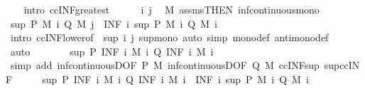 \begin{isabellebody}
\ \ \isamarkupfalse%
\ {\isacharparenleft}intro\ ccINF{\isacharunderscore}greatest{\isacharparenright}\isanewline
\ \ \ \ \isamarkupfalse%
\ i\ j\ \isamarkupfalse%
\ M\ assms{\isacharbrackleft}THEN\ inf{\isacharunderscore}continuous{\isacharunderscore}mono{\isacharbrackright}\ \isamarkupfalse%
\ {\isachardoublequoteopen}sup\ {\isacharparenleft}P\ {\isacharparenleft}M\ i{\isacharparenright}{\isacharparenright}\ {\isacharparenleft}Q\ {\isacharparenleft}M\ j{\isacharparenright}{\isacharparenright}\ {\isasymge}\ {\isacharparenleft}INF\ i{\isachardot}\ sup\ {\isacharparenleft}P\ {\isacharparenleft}M\ i{\isacharparenright}{\isacharparenright}\ {\isacharparenleft}Q\ {\isacharparenleft}M\ i{\isacharparenright}{\isacharparenright}{\isacharparenright}{\isachardoublequoteclose}\isanewline
\ \ \ \ \ \ \isamarkupfalse%
\ {\isacharparenleft}intro\ ccINF{\isacharunderscore}lower{}{\isacharbrackleft}of\ {\isacharunderscore}\ {\isachardoublequoteopen}sup\ i\ j{\isachardoublequoteclose}{\isacharbrackright}\ sup{\isacharunderscore}mono{\isacharparenright}\ {\isacharparenleft}auto\ simp{\isacharcolon}\ mono{\isacharunderscore}def\ antimono{\isacharunderscore}def{\isacharparenright}\isanewline
\ \ \isamarkupfalse%
\ auto\isanewline
\ \ \isamarkupfalse%
\ \isamarkupfalse%
\ {\isachardoublequoteopen}{\isasymdots}\ {\isasymle}\ sup\ {\isacharparenleft}P\ {\isacharparenleft}INF\ i{\isachardot}\ M\ i{\isacharparenright}{\isacharparenright}\ {\isacharparenleft}Q\ {\isacharparenleft}INF\ i{\isachardot}\ M\ i{\isacharparenright}{\isacharparenright}{\isachardoublequoteclose}\isanewline
\ \ \ \ \isamarkupfalse%
\ {\isacharparenleft}simp\ add{\isacharcolon}\ inf{\isacharunderscore}continuousD{\isacharbrackleft}OF\ P\ M{\isacharbrackright}\ inf{\isacharunderscore}continuousD{\isacharbrackleft}OF\ Q\ M{\isacharbrackright}\ ccINF{\isacharunderscore}sup\ sup{\isacharunderscore}ccINF{\isacharparenright}\isanewline
\ \ \isamarkupfalse%
\ \isamarkupfalse%
\ {\isachardoublequoteopen}sup\ {\isacharparenleft}P\ {\isacharparenleft}INF\ i{\isachardot}\ M\ i{\isacharparenright}{\isacharparenright}\ {\isacharparenleft}Q\ {\isacharparenleft}INF\ i{\isachardot}\ M\ i{\isacharparenright}{\isacharparenright}\ {\isasymge}\ {\isacharparenleft}INF\ i{\isachardot}\ sup\ {\isacharparenleft}P\ {\isacharparenleft}M\ i{\isacharparenright}{\isacharparenright}\ {\isacharparenleft}Q\ {\isacharparenleft}M\ i{\isacharparenright}{\isacharparenright}{\isacharparenright}{\isachardoublequoteclose}\ \isacommand{{\isachardot}}\isamarkupfalse%

\end{isabellebody}
